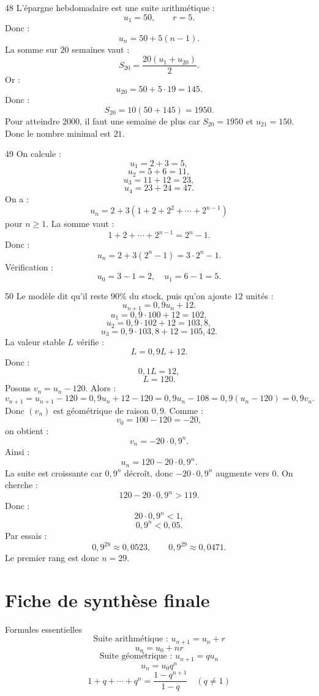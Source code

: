 \documentclass[11pt,a4paper]{article}
\begin{document}
\begin{solbox}{48}
L'épargne hebdomadaire est une suite arithmétique :
\[
u_1=50,\qquad r=5.
\]
Donc :
\[
u_n=50+5(n-1).
\]
La somme sur \(20\) semaines vaut :
\[
S_{20}=\frac{20(u_1+u_{20})}{2}.
\]
Or :
\[
u_{20}=50+5\cdot19=145.
\]
Donc :
\[
S_{20}=10(50+145)=1950.
\]
Pour atteindre \(2000\), il faut une semaine de plus car \(S_{20}=1950\) et \(u_{21}=150\). Donc le nombre minimal est \(21\).
\end{solbox}

\begin{solbox}{49}
On calcule :
\[
u_1=2+3=5,
\]
\[
u_2=5+6=11,
\]
\[
u_3=11+12=23,
\]
\[
u_4=23+24=47.
\]
On a :
\[
u_n=2+3(1+2+2^2+\cdots+2^{n-1})
\]
pour \(n\geq1\).  
La somme vaut :
\[
1+2+\cdots+2^{n-1}=2^n-1.
\]
Donc :
\[
u_n=2+3(2^n-1)=3\cdot2^n-1.
\]
Vérification :
\[
u_0=3-1=2,\quad u_1=6-1=5.
\]
\end{solbox}

\begin{solbox}{50}
Le modèle dit qu'il reste \(90\%\) du stock, puis qu'on ajoute \(12\) unités :
\[
u_{n+1}=0{,}9u_n+12.
\]
\[
u_1=0{,}9\cdot100+12=102,
\]
\[
u_2=0{,}9\cdot102+12=103{,}8,
\]
\[
u_3=0{,}9\cdot103{,}8+12=105{,}42.
\]
La valeur stable \(L\) vérifie :
\[
L=0{,}9L+12.
\]
Donc :
\[
0{,}1L=12,
\]
\[
L=120.
\]
Posons \(v_n=u_n-120\). Alors :
\[
v_{n+1}=u_{n+1}-120=0{,}9u_n+12-120=0{,}9u_n-108=0{,}9(u_n-120)=0{,}9v_n.
\]
Donc \((v_n)\) est géométrique de raison \(0{,}9\). Comme :
\[
v_0=100-120=-20,
\]
on obtient :
\[
v_n=-20\cdot0{,}9^n.
\]
Ainsi :
\[
u_n=120-20\cdot0{,}9^n.
\]
La suite est croissante car \(0{,}9^n\) décroît, donc \(-20\cdot0{,}9^n\) augmente vers \(0\).  
On cherche :
\[
120-20\cdot0{,}9^n>119.
\]
Donc :
\[
20\cdot0{,}9^n<1,
\]
\[
0{,}9^n<0{,}05.
\]
Par essais :
\[
0{,}9^{28}\approx0{,}0523,\qquad 0{,}9^{29}\approx0{,}0471.
\]
Le premier rang est donc \(n=29\).
\end{solbox}

\newpage

\section{Fiche de synthèse finale}

\begin{rememberbox}{Formules essentielles}
\[
\boxed{\text{Suite arithmétique : } u_{n+1}=u_n+r}
\]
\[
\boxed{u_n=u_0+nr}
\]
\[
\boxed{\text{Suite géométrique : } u_{n+1}=qu_n}
\]
\[
\boxed{u_n=u_0q^n}
\]
\[
\boxed{1+q+\cdots+q^n=\frac{1-q^{n+1}}{1-q}\quad(q\neq1)}
\]
\end{rememberbox}
\end{document}
